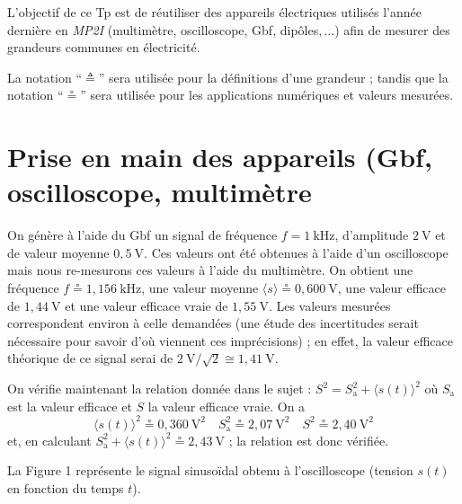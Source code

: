\documentclass[a4paper]{article}
\begin{document}
	\begin{multicols}{2}
		L'objectif de ce {\sc Tp}\/ est de réutiliser des appareils électriques utilisés l'année dernière en {\it MP2I}\/ (multimètre, oscilloscope, {\sc Gbf}, dipôles$,\ldots$) afin de mesurer des grandeurs communes en électricité.

		La notation ``$\triangleq$\/'' sera utilisée pour la définitions d'une grandeur ; tandis que la notation ``$\circeq$\/'' sera utilisée pour les applications numériques et valeurs mesurées.

		\section{Prise en main des appareils ({\sc Gbf}, oscilloscope, multimètre}

		On génère à l'aide du {\sc Gbf}\/ un signal de fréquence $f = 1\:\mathrm{kHz}$, d'amplitude $2\:\mathrm{V}$\/ et de valeur moyenne $0{,}5\:\mathrm{V}$.
		Ces valeurs ont été obtenues à l'aide d'un oscilloscope mais nous re-mesurons ces valeurs à l'aide du multimètre. On obtient une fréquence $f \circeq 1{,}156\:\mathrm{kHz}$, une valeur moyenne $\langle s \rangle \circeq 0{,}600\:\mathrm{V}$, une valeur efficace de $1{,}44\:\mathrm{V}$\/ et une valeur efficace vraie de $1{,}55\:\mathrm{V}$. Les valeurs mesurées correspondent environ à celle demandées (une étude des incertitudes serait nécessaire pour savoir d'où viennent ces imprécisions) ; en effet, la valeur efficace théorique de ce signal serai de $2\:\mathrm{V} / \sqrt{2} \cong 1{,}41\:\mathrm{V}$.

		On vérifie maintenant la relation donnée dans le sujet : $S^2 = S_\mathrm{a}^2 + \langle s(t)\rangle^2$\/ où $S_\mathrm{a}$\/ est la valeur efficace et $S$\/ la valeur efficace vraie. On a \[
			\langle s(t)\rangle^2 \circeq 0{,}360\:\mathrm{V^2} \quad
			S_\mathrm{a}^2 \circeq 2{,}07\:\mathrm{V^2} \quad
			S^2 \circeq 2{,}40\:\mathrm{V^2}
		\]
		et, en calculant $S_\mathrm{a}^2 + \langle s(t)\rangle^2 \circeq 2{,}43\:\mathrm{V}$\/ ; la relation est donc vérifiée.

		La {\sc Figure 1}\/ représente le signal sinusoïdal obtenu à l'oscilloscope (tension $s(t)$\/ en fonction du temps $t$).
	\end{multicols}
\end{document}
